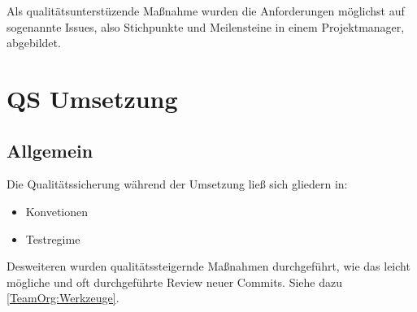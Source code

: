 Als qualitätsunterstüzende Maßnahme wurden die Anforderungen möglichst auf sogenannte Issues, also Stichpunkte und Meilensteine in einem Projektmanager, abgebildet.
\section{QS Umsetzung}
\subsection{Allgemein}
Die Qualitätssicherung während der Umsetzung ließ sich gliedern in:
\begin{itemize}
\item Konvetionen
\item Testregime
\end{itemize}
Desweiteren wurden qualitätssteigernde Maßnahmen durchgeführt, wie das leicht mögliche und oft durchgeführte Review neuer Commits. Siehe dazu \ref{TeamOrg:Werkzeuge}.
